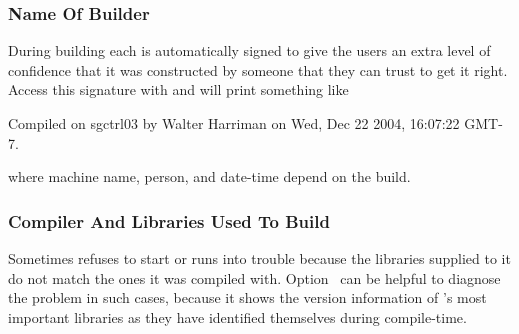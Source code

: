 \begin{table}
  \caption[Image formats and bit-depths]%
          {\label{tab:image-format-and-bit-depth}%
            Bit-depths of selected image formats.  These are the maximum capabilities of the
            formats themselves, not \App's.  The ``Mask''-column indicates whether the format
            supports an image mask (alpha-channel), see also
            \chapterName~\ref{sec:understanding-masks}.  Column~``Profile'' shows whether the
            image format allows for ~profiles to be included; see also
            \chapterName~\ref{sec:color-spaces}.}
\end{table}


\subsubsection[Builder]{\label{sec:name-of-builder}%
  Name Of Builder}

During building each \appcmd{} is automatically signed to give the users an extra level of
confidence that it was constructed by someone that they can trust to get it right.  Access this
signature with  and \appcmd{} will print something like

\begin{literal}
  Compiled on sgctrl03 by Walter Harriman on Wed, Dec 22 2004, 16:07:22 GMT-7.
\end{literal}

\noindent where machine name, person, and date-time depend on the
build.


\subsubsection[Compiler And Libraries]{\label{sec:compiler-and-libraries}%
  Compiler And Libraries Used To Build}

Sometimes \appcmd{} refuses to start or runs into trouble because the libraries supplied to it
do not match the ones it was compiled with.  Option~ can be helpful to diagnose the problem in such cases, because it shows
the version information of \App's most important libraries as they have identified themselves
during compile-time.

